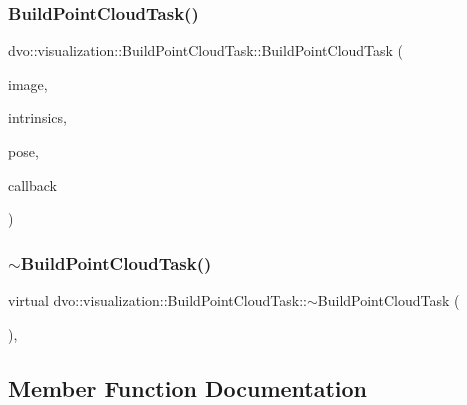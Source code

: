 \subsubsection{\texorpdfstring{Build\+Point\+Cloud\+Task()}{BuildPointCloudTask()}}
{\footnotesize\ttfamily dvo\+::visualization\+::\+Build\+Point\+Cloud\+Task\+::\+Build\+Point\+Cloud\+Task (\begin{DoxyParamCaption}\item[{const \mbox{\hyperlink{structdvo_1_1core_1_1_rgbd_image}{dvo\+::core\+::\+Rgbd\+Image}} \&}]{image,  }\item[{const \mbox{\hyperlink{structdvo_1_1core_1_1_intrinsic_matrix}{dvo\+::core\+::\+Intrinsic\+Matrix}} \&}]{intrinsics,  }\item[{const Eigen\+::\+Affine3d \&}]{pose,  }\item[{\mbox{\hyperlink{classdvo_1_1visualization_1_1_async_point_cloud_builder_aeea54b24aabbcfe12b2db923c8befc77}{Async\+Point\+Cloud\+Builder\+::\+Done\+Callback}} \&}]{callback }\end{DoxyParamCaption})\hspace{0.3cm}{\ttfamily [inline]}}

\mbox{\label{classdvo_1_1visualization_1_1_build_point_cloud_task_a36ec8829378677b87aca9dd3ef9c5a68}} 
\subsubsection{\texorpdfstring{$\sim$\+Build\+Point\+Cloud\+Task()}{~BuildPointCloudTask()}}
{\footnotesize\ttfamily virtual dvo\+::visualization\+::\+Build\+Point\+Cloud\+Task\+::$\sim$\+Build\+Point\+Cloud\+Task (\begin{DoxyParamCaption}{ }\end{DoxyParamCaption})\hspace{0.3cm}{\ttfamily [inline]}, {\ttfamily [virtual]}}



\subsection{Member Function Documentation}
\mbox{\label{classdvo_1_1visualization_1_1_build_point_cloud_task_aa9ee4ddd7a6ed4fda80328ed542b7f03}} 
